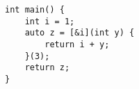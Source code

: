 \begin{lstlisting}[title=\href{https://godbolt.org/z/8qrx6b}{\texttt{godbolt.org/z/8qrx6b}}]
int main() {
    int i = 1;
    auto z = [&i](int y) {
        return i + y;
    }(3);
    return z;
}
\end{lstlisting}
